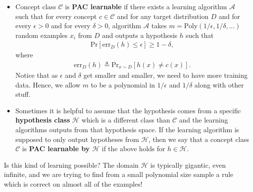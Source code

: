 \documentclass[10pt ]{article}
\begin{document}
\begin{itemize}
\item Concept class $\mathcal{C}$ is \textbf{PAC learnable} if there exists a learning algorithm $\mathcal{A}$ such that for every concept $c \in \mathcal{C}$ and for any target distribution $D$ and for every $\epsilon >0$ and for every $\delta > 0 $, algorithm $\mathcal{A}$ takes $m = \mathrm{Poly}(1/\epsilon, 1/\delta, ...)$ random examples $x_i$ from $D$ and outputs a hypothesis $h$ such that 
\begin{align}
\mathrm{Pr} \left[ \mathrm{err}_D(h) \le \epsilon \right] \ge 1-\delta,
\end{align}
where 
\begin{align}
\mathrm{err}_D(h) \triangleq \mathrm{Pr}_{x \sim D}\left[ h(x) \neq c(x)\right].
\end{align}
Notice that as $\epsilon$ and $\delta$ get smaller and smaller, we need to have more training data. Hence, we allow $m$ to be a polynomial in $1/\epsilon$ and $1/\delta$ along with other stuff. 
\item Sometimes it is helpful to assume that the hypothesis comes from a specific \textbf{hypothesis class} $\mathcal{H}$ which is a different class than $\mathcal{C}$ and the learning algorithms outputs from that hypothesis space. If the learning algorithm is supposed to only output hypotheses from $\mathcal{H}$, then we say that a concept class $\mathcal{C}$ is \textbf{PAC learnable by $\mathcal{H}$} if the above holds for $h \in \mathcal{H}$.
\end{itemize}
Is this kind of learning possible? The domain $\mathcal{H}$ is typically gigantic, even infinite, and we are trying to find  from a small polynomial size sample a rule which is correct on almost all of the examples!
\end{document}
